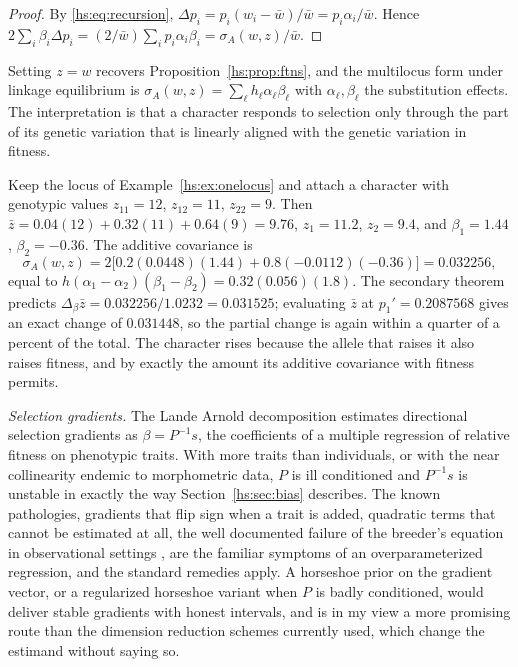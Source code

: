 \begin{proof}
By \eqref{hs:eq:recursion}, $\Delta p_i = p_i(w_i-\bar w)/\bar w = p_i\alpha_i/\bar w$. Hence $2\sum_i\beta_i\Delta p_i = (2/\bar w)\sum_ip_i\alpha_i\beta_i = \sigma_A(w,z)/\bar w$.
\end{proof}

Setting $z = w$ recovers Proposition~\ref{hs:prop:ftns}, and the multilocus form under linkage equilibrium is $\sigma_A(w,z) = \sum_\ell h_\ell\alpha_\ell\beta_\ell$ with $\alpha_\ell,\beta_\ell$ the substitution effects. The interpretation is that a character responds to selection only through the part of its genetic variation that is linearly aligned with the genetic variation in fitness.

\begin{example}
\label{hs:ex:robertson}
Keep the locus of Example~\ref{hs:ex:onelocus} and attach a character with genotypic values $z_{11} = 12$, $z_{12} = 11$, $z_{22} = 9$. Then $\bar z = 0.04(12) + 0.32(11) + 0.64(9) = 9.76$, $z_1 = 11.2$, $z_2 = 9.4$, and $\beta_1 = 1.44$, $\beta_2 = -0.36$. The additive covariance is
\[
\sigma_A(w,z) = 2\big[0.2(0.0448)(1.44) + 0.8(-0.0112)(-0.36)\big] = 0.032256,
\]
equal to $h(\alpha_1-\alpha_2)(\beta_1-\beta_2) = 0.32(0.056)(1.8)$. The secondary theorem predicts $\Delta_\beta\bar z = 0.032256/1.0232 = 0.031525$; evaluating $\bar z$ at $p_1' = 0.2087568$ gives an exact change of $0.031448$, so the partial change is again within a quarter of a percent of the total. The character rises because the allele that raises it also raises fitness, and by exactly the amount its additive covariance with fitness permits.
\end{example}

\emph{Selection gradients.} The Lande Arnold decomposition \citep{hs:lande1983measurement} estimates directional selection gradients as $\beta = P^{-1}s$, the coefficients of a multiple regression of relative fitness on phenotypic traits. With more traits than individuals, or with the near collinearity endemic to morphometric data, $P$ is ill conditioned and $P^{-1}s$ is unstable in exactly the way Section~\ref{hs:sec:bias} describes. The known pathologies, gradients that flip sign when a trait is added, quadratic terms that cannot be estimated at all, the well documented failure of the breeder's equation in observational settings \citep{hs:morrissey2010danger}, are the familiar symptoms of an overparameterized regression, and the standard remedies apply. A horseshoe prior on the gradient vector, or a regularized horseshoe variant when $P$ is badly conditioned, would deliver stable gradients with honest intervals, and is in my view a more promising route than the dimension reduction schemes currently used, which change the estimand without saying so.


